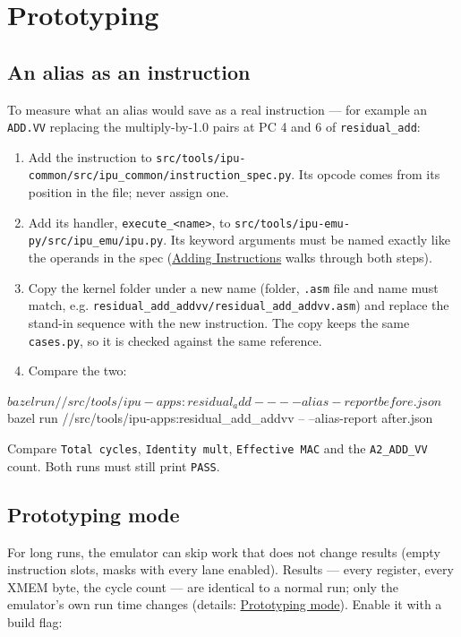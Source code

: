 \documentclass[11pt,a4paper]{article}
\newcommand{\doc}[2]{\href{https://rechefe.github.io/ipu-emulator/#1/}{\textcolor{accent}{#2}}}
\begin{document}
\section{Prototyping}\label{sec:proto}

\subsection{An alias as an instruction}

To measure what an alias would save as a real instruction --- for example an
\texttt{ADD.VV} replacing the multiply-by-1.0 pairs at PC 4 and 6 of
\texttt{residual\_add}:

\begin{enumerate}
\item Add the instruction to
  \texttt{src/tools/ipu-common/src/ipu\_common/instruction\_spec.py}. Its
  opcode comes from its position in the file; never assign one.
\item Add its handler, \texttt{execute\_<name>}, to
  \texttt{src/tools/ipu-emu-py/src/ipu\_emu/ipu.py}. Its keyword arguments must
  be named exactly like the operands in the spec
  (\doc{adding-instruction}{Adding Instructions} walks through both steps).
\item Copy the kernel folder under a new name (folder, \texttt{.asm} file and
  name must match, e.g. \texttt{residual\_add\_addvv/residual\_add\_addvv.asm})
  and replace the stand-in sequence with the new instruction. The copy keeps
  the same \texttt{cases.py}, so it is checked against the same reference.
\item Compare the two:
\end{enumerate}

\begin{termcmd}
$ bazel run //src/tools/ipu-apps:residual_add       -- --alias-report before.json
$ bazel run //src/tools/ipu-apps:residual_add_addvv -- --alias-report after.json
\end{termcmd}

Compare \texttt{Total cycles}, \texttt{Identity mult}, \texttt{Effective MAC}
and the \texttt{A2\_ADD\_VV} count. Both runs must still print \texttt{PASS}.

\subsection{Prototyping mode}

\needspace{5.9cm}
For long runs, the emulator can skip work that does not change results (empty
instruction slots, masks with every lane enabled). Results --- every register,
every XMEM byte, the cycle count --- are identical to a normal run; only the
emulator's own run time changes (details: \doc{prototyping-mode}{Prototyping mode}).
Enable it with a build flag:
\end{document}
